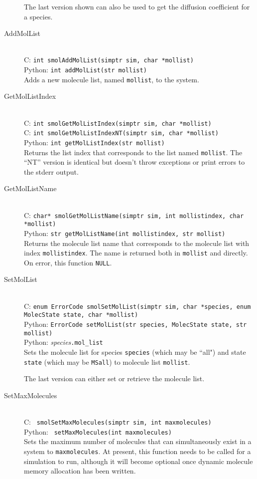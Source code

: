 \documentclass {book}
\newcommand {\ttt} {\texttt}
\begin{document}
\begin{description}
The last version shown can also be used to get the diffusion coefficient for a species.


\item[AddMolList]
\hfill \\
C: \ttt{int smolAddMolList(simptr sim, char *mollist)}\\
Python: \ttt{int addMolList(str mollist)}\\
Adds a new molecule list, named \ttt{mollist}, to the system.

\item[GetMolListIndex]
\hfill \\
C: \ttt{int smolGetMolListIndex(simptr sim, char *mollist)}\\
C: \ttt{int smolGetMolListIndexNT(simptr sim, char *mollist)}\\
Python: \ttt{int getMolListIndex(str mollist)}\\
Returns the list index that corresponds to the list named \ttt{mollist}. The ``NT'' version is identical but doesn't throw exceptions or print errors to the stderr output.

\item[GetMolListName]
\hfill \\
C: \ttt{char* smolGetMolListName(simptr sim, int mollistindex, char *mollist)}\\
Python: \ttt{str getMolListName(int mollistindex, str mollist)}\\
Returns the molecule list name that corresponds to the molecule list with index \ttt{mollistindex}. The name is returned both in \ttt{mollist} and directly. On error, this function \ttt{NULL}.

\item[SetMolList]
\hfill \\
C: \ttt{enum ErrorCode smolSetMolList(simptr sim, char *species, enum MolecState state, char *mollist)}\\
Python: \ttt{ErrorCode setMolList(str species, MolecState state, str mollist)}\\
Python: \textit{species}\ttt{.mol\_list}\\
Sets the molecule list for species \ttt{species} (which may be ``all") and state \ttt{state} (which may be \ttt{MSall}) to molecule list \ttt{mollist}.

The last version can either set or retrieve the molecule list.

\item[SetMaxMolecules]
\hfill \\
C: \ttt{ smolSetMaxMolecules(simptr sim, int maxmolecules)}\\
Python: \ttt{ setMaxMolecules(int maxmolecules)}\\
Sets the maximum number of molecules that can simultaneously exist in a system to \ttt{maxmolecules}. At present, this function needs to be called for a simulation to run, although it will become optional once dynamic molecule memory allocation has been written.


\end{description}
\end{document}
